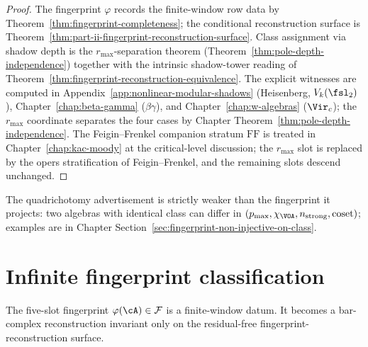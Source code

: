 \begin{proof}
The fingerprint $\varphi$ records the finite-window row data by
Theorem~\ref{thm:fingerprint-completeness}; the conditional
reconstruction surface is
Theorem~\ref{thm:part-ii-fingerprint-reconstruction-surface}. Class
assignment via shadow depth is the $r_{\max}$-separation theorem
\textup{(}Theorem~\ref{thm:pole-depth-independence}\textup{)}
together with the intrinsic shadow-tower reading of
Theorem~\ref{thm:fingerprint-reconstruction-equivalence}. The explicit witnesses are
computed in Appendix~\ref{app:nonlinear-modular-shadows}
\textup{(}Heisenberg, $V_k(\fsl_2)$\textup{)},
Chapter~\ref{chap:beta-gamma} \textup{(}$\beta\gamma$\textup{)}, and
Chapter~\ref{chap:w-algebras} \textup{(}$\Vir_c$\textup{)}; the
$r_{\max}$ coordinate separates the four cases by Chapter
Theorem~\ref{thm:pole-depth-independence}. The Feigin--Frenkel
companion stratum $\mathrm{FF}$ is treated in
Chapter~\ref{chap:kac-moody} at the critical-level discussion; the
$r_{\max}$ slot is replaced by the opers stratification of
Feigin--Frenkel, and the remaining slots descend unchanged.
\end{proof}

The quadrichotomy advertisement is strictly weaker than the
fingerprint it projects: two algebras with identical class can
differ in $(p_{\max}, \chi_{\VOA}, n_{\mathrm{strong}},
\mathrm{coset})$; examples are in Chapter
Section~\ref{sec:fingerprint-non-injective-on-class}.

\section{Infinite fingerprint classification}
\label{sec:part-ii-fingerprint}

The five-slot fingerprint
$\varphi(\cA) \in \mathcal{F}$ is a finite-window datum. It becomes
a bar-complex reconstruction invariant only on the residual-free
fingerprint-reconstruction surface.

